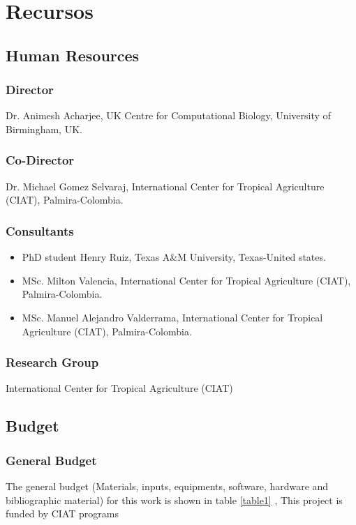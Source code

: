 \chapter{Recursos} %
\label{Chapter7}

\section{Human Resources}
\subsection{Director}
Dr. Animesh Acharjee, UK Centre for Computational Biology, University of Birmingham, UK.
\subsection{Co-Director}
Dr. Michael Gomez Selvaraj, International Center for Tropical Agriculture (CIAT), Palmira-Colombia.
\subsection{Consultants}
\begin{itemize}
\item PhD student Henry Ruiz, Texas A\&M University, Texas-United states.
\item MSc. Milton Valencia, International Center for Tropical Agriculture (CIAT), Palmira-Colombia.
\item MSc. Manuel Alejandro Valderrama, International Center for Tropical Agriculture (CIAT), Palmira-Colombia.
\end{itemize}
\subsection{Research Group}
International Center for Tropical Agriculture (CIAT)

\section{Budget}
\subsection{General Budget}
The general budget (Materials, inputs, equipments, software, hardware and bibliographic material)  for this work is shown in table \ref{table1} , This project is funded by CIAT programs

